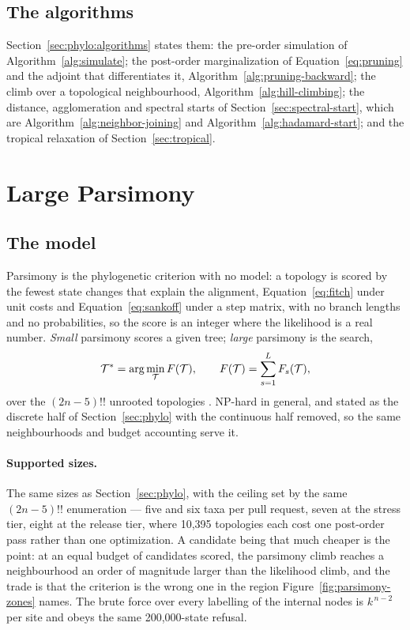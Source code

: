 \documentclass[11pt,a4paper]{article}
\begin{document}
\subsection{The algorithms}
Section~\ref{sec:phylo:algorithms} states them: the pre-order
simulation of Algorithm~\ref{alg:simulate}; the post-order marginalization of
Equation~\ref{eq:pruning} and the adjoint that differentiates it,
Algorithm~\ref{alg:pruning-backward}; the climb over a topological
neighbourhood, Algorithm~\ref{alg:hill-climbing}; the distance, agglomeration
and spectral starts of Section~\ref{sec:spectral-start}, which are
Algorithm~\ref{alg:neighbor-joining} and Algorithm~\ref{alg:hadamard-start};
and the tropical relaxation of Section~\ref{sec:tropical}.

\section{Large Parsimony}
\label{sec:parsimony}

\subsection{The model}
\label{sec:parsimony:model}
Parsimony is the phylogenetic criterion with no model: a topology is scored
by the fewest state changes that explain the alignment, Equation~\ref{eq:fitch}
under unit costs and Equation~\ref{eq:sankoff} under a step matrix, with no
branch lengths and no probabilities, so the score is an integer where the
likelihood is a real number. \emph{Small} parsimony scores a given tree;
\emph{large} parsimony is the search,
\begin{equation}
  \mathcal{T}^{\ast} = \arg\min_{\mathcal{T}} F(\mathcal{T}),
  \qquad
  F(\mathcal{T}) = \sum_{s=1}^{L} F_s(\mathcal{T}),
  \label{eq:large-parsimony}
\end{equation}
over the $(2n-5)!!$ unrooted topologies \citep{felsenstein2004}. NP-hard in
general, and stated as the discrete half of Section~\ref{sec:phylo} with the
continuous half removed, so the same neighbourhoods and budget accounting
serve it.

\paragraph{Supported sizes.}
\label{par:parsimony:sizes}
The same sizes as Section~\ref{sec:phylo}, with the ceiling set by the same
$(2n-5)!!$ enumeration --- five and six taxa per pull request, seven at the
stress tier, eight at the release tier, where 10,395 topologies each cost one
post-order pass rather than one optimization. A candidate being that much
cheaper is the point: at an equal budget of candidates scored, the parsimony
climb reaches a neighbourhood an order of magnitude larger than the likelihood
climb, and the trade is that the criterion is the wrong one in the region
Figure~\ref{fig:parsimony-zones} names. The brute force over every labelling
of the internal nodes is $k^{\,n-2}$ per site and obeys the same 200,000-state
refusal.
\end{document}

